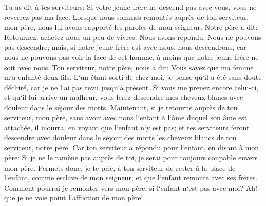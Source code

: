 \verse Tu as dit à tes serviteurs: Si votre jeune frère ne descend pas avec vous, vous ne reverrez pas ma face. 
\verse Lorsque nous sommes remontés auprès de ton serviteur, mon père, nous lui avons rapporté les paroles de mon seigneur. 
\verse Notre père a dit: Retournez, achetez-nous un peu de vivres. 
\verse Nous avons répondu: Nous ne pouvons pas descendre; mais, si notre jeune frère est avec nous, nous descendrons, car nous ne pouvons pas voir la face de cet homme, à moins que notre jeune frère ne soit avec nous. 
\verse Ton serviteur, notre père, nous a dit: Vous savez que ma femme m`a enfanté deux fils. 
\verse L`un étant sorti de chez moi, je pense qu`il a été sans doute déchiré, car je ne l`ai pas revu jusqu`à présent. 
\verse Si vous me prenez encore celui-ci, et qu`il lui arrive un malheur, vous ferez descendre mes cheveux blancs avec douleur dans le séjour des morts. 
\verse Maintenant, si je retourne auprès de ton serviteur, mon père, sans avoir avec nous l`enfant à l`âme duquel son âme est attachée, 
\verse il mourra, en voyant que l`enfant n`y est pas; et tes serviteurs feront descendre avec douleur dans le séjour des morts les cheveux blancs de ton serviteur, notre père. 
\verse Car ton serviteur a répondu pour l`enfant, en disant à mon père: Si je ne le ramène pas auprès de toi, je serai pour toujours coupable envers mon père. 
\verse Permets donc, je te prie, à ton serviteur de rester à la place de l`enfant, comme esclave de mon seigneur; et que l`enfant remonte avec ses frères. 
\verse Comment pourrai-je remonter vers mon père, si l`enfant n`est pas avec moi? Ah! que je ne voie point l`affliction de mon père! 

